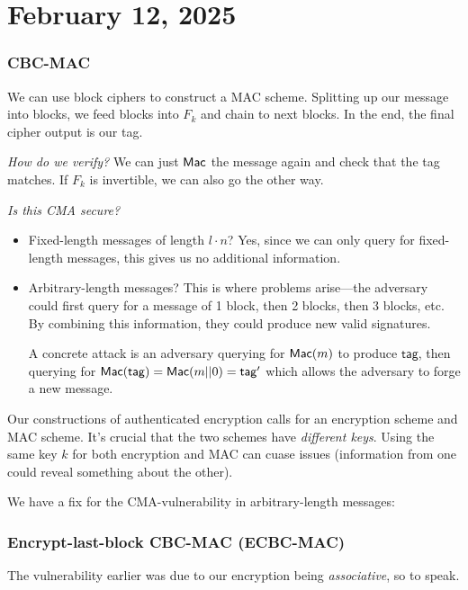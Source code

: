 \section{February 12, 2025}
\label{20250212}

\subsubsection{CBC-MAC}
We can use block ciphers to construct a MAC scheme. Splitting up our message into blocks, we feed blocks into $F_k$ and chain to next blocks. In the end, the final cipher output is our tag.


\emph{How do we verify?} We can just $\operatorname{\mathsf{Mac}}$ the message again and check that the tag matches. If $F_k$ is invertible, we can also go the other way.

\emph{Is this CMA secure?}
\begin{itemize}
    \item
          Fixed-length messages of length $l\cdot n$? Yes, since we can only query for fixed-length messages, this gives us no additional information.
    \item
          Arbitrary-length messages? This is where problems arise---the adversary could first query for a message of 1 block, then 2 blocks, then 3 blocks, etc. By combining this information, they could produce new valid signatures.

          A concrete attack is an adversary querying for $\operatorname{\mathsf{Mac}}(m)$ to produce $\mathsf{tag}$, then querying for $\operatorname{\mathsf{Mac}}(\mathsf{tag}) = \operatorname{\mathsf{Mac}}(m||0) = \mathsf{tag}'$ which allows the adversary to forge a new message.
\end{itemize}

\begin{remark*}
    Our constructions of authenticated encryption calls for an encryption scheme and MAC scheme. It's crucial that the two schemes have \emph{different keys}. Using the same key $k$ for both encryption and MAC can cuase issues (information from one could reveal something about the other).
\end{remark*}

We have a fix for the CMA-vulnerability in arbitrary-length messages:

\subsubsection{Encrypt-last-block CBC-MAC (ECBC-MAC)}
The vulnerability earlier was due to our encryption being \emph{associative}, so to speak.

